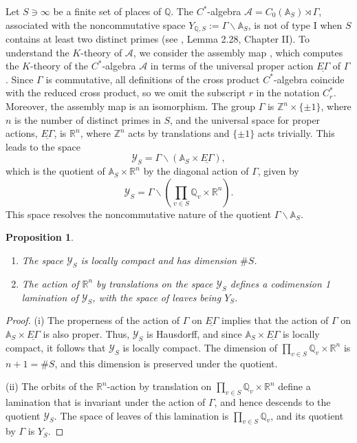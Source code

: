 \documentclass[letterpaper,11pt]{article}
\theoremstyle{plain}
\newtheorem{prop}[thm]{Proposition}
\begin{document}
 Let $ S \ni \infty $ be a finite set of places of $ \mathbb{Q} $. The $ C^* $-algebra $ \mathcal{A} = C_0(\mathbb{A}_S) \rtimes \Gamma $, associated with the noncommutative space $ Y_{\mathbb{Q}, S} := \Gamma \backslash \mathbb{A}_S $, is not of type I when $ S $ contains at least two distinct primes (see \cite{CM}, Lemma 2.28, Chapter II). To understand the $ K $-theory of $ \mathcal{A} $, we consider the assembly map \cite{BCH}, which computes the $ K $-theory of the $ C^* $-algebra $ \mathcal{A} $ in terms of the universal proper action $ \underline{E\Gamma} $ of $ \Gamma $. Since $ \Gamma $ is commutative, all definitions of the cross product $ C^* $-algebra coincide with the reduced cross product, so we omit the subscript $ r $ in the notation $ C^*_r $. Moreover, the assembly map is an isomorphism. The group $ \Gamma $ is $ \mathbb{Z}^n \times \{\pm 1\} $, where $ n $ is the number of distinct primes in $ S $, and the universal space for proper actions, $ \underline{E \Gamma} $, is $ \mathbb{R}^n $, where $ \mathbb{Z}^n $ acts by translations and $ \{\pm 1\} $ acts trivially. This leads to the space 
\[
\mathcal{Y}_S = \Gamma \backslash \left( \mathbb{A}_S \times \underline{E \Gamma} \right),
\]
which is the quotient of $ \mathbb{A}_S \times \mathbb{R}^n $ by the diagonal action of $ \Gamma $, given by
\[
\mathcal{Y}_S = \Gamma \backslash \left( \prod_{v \in S} \mathbb{Q}_v \times \mathbb{R}^n \right).
\]
This space resolves the noncommutative nature of the quotient $ \Gamma \backslash \mathbb{A}_S $.

\begin{prop}
\label{bciso}
\begin{enumerate}
\item[(i)] The space $ \mathcal{Y}_S $ is locally compact and has dimension $ \#S $.
\item[(ii)] The action of $ \mathbb{R}^n $ by translations on the space $ \mathcal{Y}_S $ defines a codimension 1 lamination of $ \mathcal{Y}_S $, with the space of leaves being $ Y_S $.
\end{enumerate}
\end{prop}

\begin{proof}
(i) The properness of the action of $ \Gamma $ on $ \underline{E \Gamma} $ implies that the action of $ \Gamma $ on $ \mathbb{A}_S \times \underline{E \Gamma} $ is also proper. Thus, $ \mathcal{Y}_S $ is Hausdorff, and since $ \mathbb{A}_S \times \underline{E \Gamma} $ is locally compact, it follows that $ \mathcal{Y}_S $ is locally compact. The dimension of $ \prod_{v \in S} \mathbb{Q}_v \times \mathbb{R}^n $ is $ n + 1 = \#S $, and this dimension is preserved under the quotient.

(ii) The orbits of the $ \mathbb{R}^n $-action by translation on $ \prod_{v \in S} \mathbb{Q}_v \times \mathbb{R}^n $ define a lamination that is invariant under the action of $ \Gamma $, and hence descends to the quotient $ \mathcal{Y}_S $. The space of leaves of this lamination is $ \prod_{v \in S} \mathbb{Q}_v $, and its quotient by $ \Gamma $ is $ Y_S $.
\end{proof}
\end{document}
